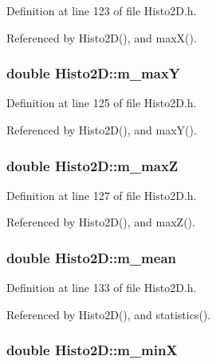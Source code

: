 Definition at line 123 of file Histo2D.h.

Referenced by Histo2D(), and maxX().\hypertarget{classHisto2D_a049044e82d008636040c5c8815cac297}{
\subsubsection[{m\_\-maxY}]{\setlength{\rightskip}{0pt plus 5cm}double {\bf Histo2D::m\_\-maxY}}}
\label{classHisto2D_a049044e82d008636040c5c8815cac297}


Definition at line 125 of file Histo2D.h.

Referenced by Histo2D(), and maxY().\hypertarget{classHisto2D_a82422535a6aeaf911129c91e0e44e603}{
\subsubsection[{m\_\-maxZ}]{\setlength{\rightskip}{0pt plus 5cm}double {\bf Histo2D::m\_\-maxZ}}}
\label{classHisto2D_a82422535a6aeaf911129c91e0e44e603}


Definition at line 127 of file Histo2D.h.

Referenced by Histo2D(), and maxZ().\hypertarget{classHisto2D_a78286e1d11cc657a5fd1bd1f60c8dff9}{
\subsubsection[{m\_\-mean}]{\setlength{\rightskip}{0pt plus 5cm}double {\bf Histo2D::m\_\-mean}}}
\label{classHisto2D_a78286e1d11cc657a5fd1bd1f60c8dff9}


Definition at line 133 of file Histo2D.h.

Referenced by Histo2D(), and statistics().\hypertarget{classHisto2D_a039d7f45ec8b5b84c1d71f8f87884211}{
\subsubsection[{m\_\-minX}]{\setlength{\rightskip}{0pt plus 5cm}double {\bf Histo2D::m\_\-minX}}}
\label{classHisto2D_a039d7f45ec8b5b84c1d71f8f87884211}


